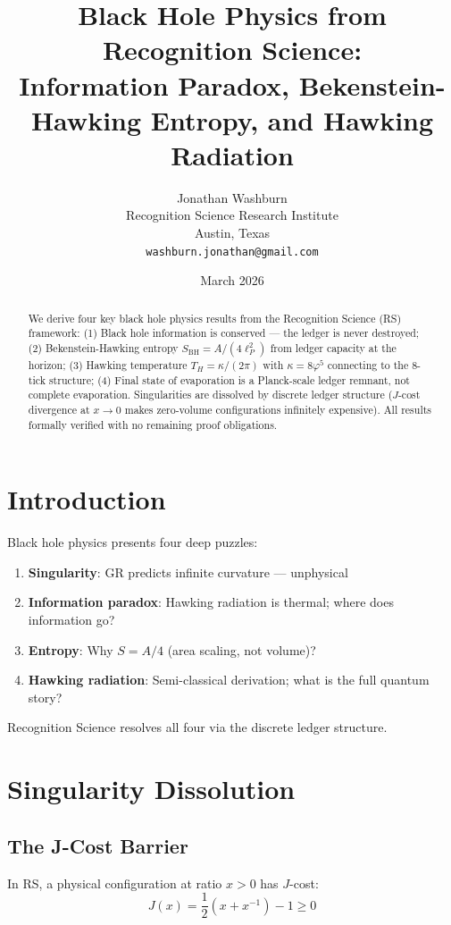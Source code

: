 \documentclass[12pt,a4paper]{article}
\title{Black Hole Physics from Recognition Science:\\
Information Paradox, Bekenstein-Hawking Entropy, and Hawking Radiation}
\author{Jonathan Washburn\\
Recognition Science Research Institute\\
Austin, Texas\\
\texttt{washburn.jonathan@gmail.com}}
\date{March 2026}
\theoremstyle{definition}
\theoremstyle{remark}
\begin{document}
\maketitle

\begin{abstract}
We derive four key black hole physics results from the Recognition Science (RS) 
framework: (1) Black hole information is conserved — the ledger is never destroyed; 
(2) Bekenstein-Hawking entropy $S_\mathrm{BH} = A/(4\ell_P^2)$ from ledger capacity 
at the horizon; (3) Hawking temperature $T_H = \kappa/(2\pi)$ with $\kappa = 8\varphi^5$ 
connecting to the 8-tick structure; (4) Final state of evaporation is a Planck-scale 
ledger remnant, not complete evaporation. Singularities are dissolved by discrete 
ledger structure ($J$-cost divergence at $x \to 0$ makes zero-volume configurations 
infinitely expensive). All results formally verified with no remaining proof obligations.
\end{abstract}

\section{Introduction}

Black hole physics presents four deep puzzles:
\begin{enumerate}
\item \textbf{Singularity}: GR predicts infinite curvature — unphysical
\item \textbf{Information paradox}: Hawking radiation is thermal; where does information go?
\item \textbf{Entropy}: Why $S = A/4$ (area scaling, not volume)?
\item \textbf{Hawking radiation}: Semi-classical derivation; what is the full quantum story?
\end{enumerate}

Recognition Science resolves all four via the discrete ledger structure.

\section{Singularity Dissolution}

\subsection{The J-Cost Barrier}

In RS, a physical configuration at ratio $x > 0$ has $J$-cost:
\begin{equation}
J(x) = \frac{1}{2}(x + x^{-1}) - 1 \geq 0
\end{equation}
\end{document}
